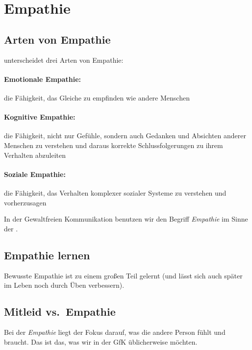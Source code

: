 \section{Empathie}
\label{empathie}

\subsection{Arten von Empathie}

\cite{shaw-empathie} unterscheidet drei Arten von Empathie:

\paragraph{Emotionale Empathie:} die Fähigkeit, das Gleiche zu empfinden wie andere Menschen

\paragraph{Kognitive Empathie:} die Fähigkeit, nicht nur Gefühle, sondern auch Gedanken und Absichten anderer Menschen zu verstehen und daraus korrekte Schlussfolgerungen zu ihrem Verhalten abzuleiten

\paragraph{Soziale Empathie:} die Fähigkeit, das Verhalten komplexer sozialer Systeme zu verstehen und vorherzusagen

In der Gewaltfreien Kommunikation benutzen wir den Begriff \emph{Empathie} im Sinne der .

\subsection{Empathie lernen}

Bewusste Empathie ist zu einem großen Teil gelernt (und lässt sich auch später im Leben noch durch Üben verbessern).


\subsection{Mitleid vs.~Empathie}
\label{mitgleid}

Bei der \emph{Empathie} liegt der Fokus darauf, was die andere Person fühlt und braucht. Das ist das, was wir in der GfK üblicherweise möchten.

